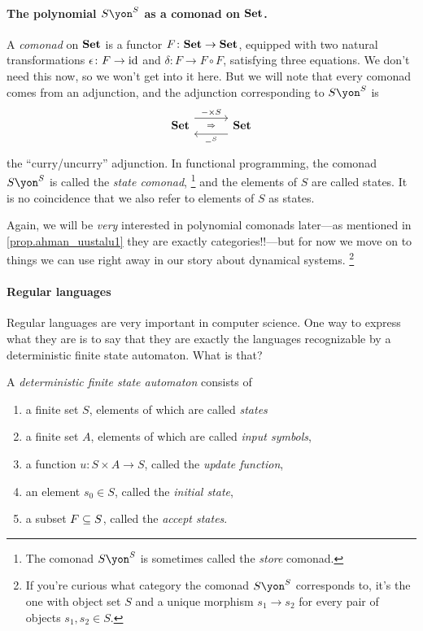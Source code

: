 \documentclass[Book-Poly]{subfiles}
\begin{document}
\paragraph{The polynomial $S\yon^S$ as a comonad on $\smset$.}\label{page.poly_comonad}

A \emph{comonad} on $\smset$ is a functor $F\colon\smset\to\smset$, equipped with two natural transformations $\epsilon\colon F\to\id$ and $\delta\colon F\to F\circ F$, satisfying three equations. We don't need this now, so we won't get into it here. But we will note that every comonad comes from an adjunction, and the adjunction corresponding to $S\yon^S$ is
\[
\adj{\smset}{-\times S}{-^S}{\smset}
\]
the ``curry/uncurry'' adjunction. In functional programming, the comonad $S\yon^S$ is called the \emph{state comonad},%
\footnote{The comonad $S\yon^S$ is sometimes called the \emph{store} comonad.} 
and the elements of $S$ are called states. It is no coincidence that we also refer to elements of $S$ as states. 

Again, we will be \emph{very} interested in polynomial comonads later---as mentioned in \cref{prop.ahman_uustalu1} they are exactly categories!!---but for now we move on to things we can use right away in our story about dynamical systems.%
\footnote{If you're curious what category the comonad $S\yon^S$ corresponds to, it's the one with object set $S$ and a unique morphism $s_1\to s_2$ for every pair of objects $s_1,s_2\in S$.}

\paragraph{Regular languages}

Regular languages are very important in computer science. One way to express what they are is to say that they are exactly the languages recognizable by a deterministic finite state automaton. What is that?

\begin{definition}\label{def.dfa}
A \emph{deterministic finite state automaton} consists of
\begin{enumerate}
	\item a finite set $S$, elements of which are called \emph{states}
	\item a finite set $A$, elements of which are called \emph{input symbols},
	\item a function $u\colon S\times A\to S$, called the \emph{update function},
	\item an element $s_0\in S$, called the \emph{initial state},
	\item a subset $F\ss S$, called the \emph{accept states}.
\end{enumerate}
\end{definition}
\end{document}
